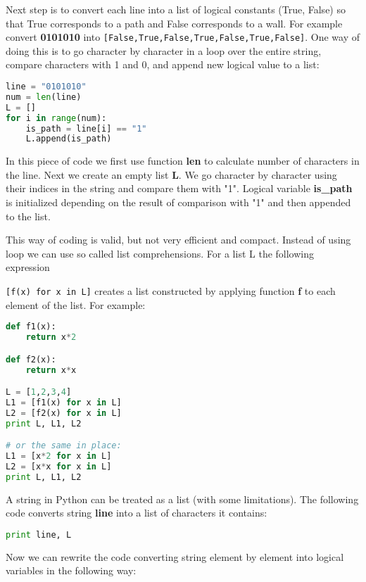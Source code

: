 Next step is to convert each line into a 
list of logical constants (True, False)
so that True corresponds to a path and False 
corresponds to a wall. For example
convert \textbf{0101010} into 
\lstinline{[False,True,False,True,False,True,False]}. One way of doing
this is to go character by character in a loop over the entire string,
compare characters with 1 and 0, and append new logical value to a list:

\begin{lstlisting}[language=Python,style=codelst2,caption={String element by element}]
line = "0101010"
num = len(line)
L = []
for i in range(num):
    is_path = line[i] == "1"
    L.append(is_path)
\end{lstlisting}
In this piece of code we first use function \textbf{len} to calculate
number of characters in the line. Next we create an empty list \textbf{L}.
We go character by character using their indices in the string
and compare them with "1". Logical variable 
\textbf{is\_path} is initialized
depending on the result of comparison with "1" and then appended to 
the list.

This way of coding is valid, but not very efficient and compact.
Instead of using loop we can use so called list comprehensions. For
a list L the following expression

\bigskip
\lstinline{[f(x) for x in L]}
\bigskip
creates a list constructed by applying 
function \textbf{f} to each element
of the list. For example:

\begin{lstlisting}[language=Python,style=codelst,caption={Python: list comprehensions}]
def f1(x):
    return x*2

def f2(x):
    return x*x

L = [1,2,3,4]
L1 = [f1(x) for x in L]
L2 = [f2(x) for x in L]
print L, L1, L2

# or the same in place:
L1 = [x*2 for x in L]
L2 = [x*x for x in L]
print L, L1, L2
\end{lstlisting}

A string in Python can be treated as a list 
(with some limitations).
The following code converts string \textbf{line} into a
list of characters it contains:

\begin{lstlisting}[language=Python,style=codelst2,caption={String to list}
line = "abc"
L = [x for x in line]
print line, L
\end{lstlisting}

Now we can rewrite the code converting string element by element into
logical variables in the following way:

